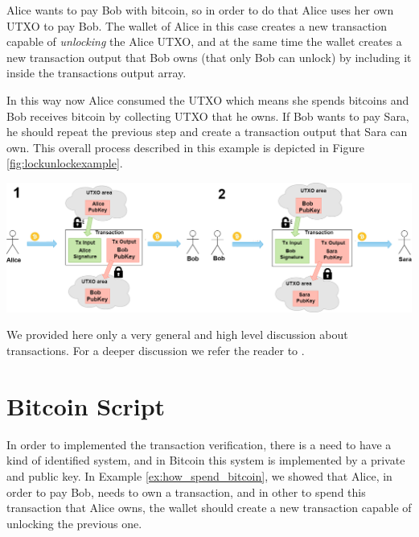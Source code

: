 \begin{example}\label{ex:how_spend_bitcoin}
    Alice wants to pay Bob with bitcoin, so in order to do that Alice
    uses her own UTXO to pay Bob. The wallet of Alice in this case creates a new transaction
    capable of \emph{unlocking} the Alice UTXO, and at the same time the wallet creates 
    a new transaction output that Bob owns (that only Bob can unlock) by including it inside the transactions output array. 

    In this way now Alice consumed the UTXO which means she spends bitcoins and Bob receives bitcoin by collecting UTXO that he owns. 
    If Bob wants to pay Sara, he should repeat the previous step and create a transaction output that Sara can own. This overall process described in this example is depicted in  Figure \ref{fig:lockunlockexample}.

    {\centering
     \vspace{5pt}
      \includegraphics[scale=0.3]{imgs/DiagramUnlocLockUTXO.png}
      \vspace{10pt}
     \par}
\end{example}


We provided here only a very general and high level discussion about transactions. For a deeper discussion we refer the reader to \cite{Palazzo_Estrazione_di_Informazioni_2021}.

\section{Bitcoin Script}

In order to implemented the transaction verification, there is a need to have
a kind of identified system, and in Bitcoin this system is implemented by a private and public key.
In Example \ref{ex:how_spend_bitcoin}, we showed  that Alice, in order to pay Bob, needs to 
own a transaction, and in other to spend this transaction that Alice owns, the wallet should
create a new transaction capable of unlocking the previous one. 

